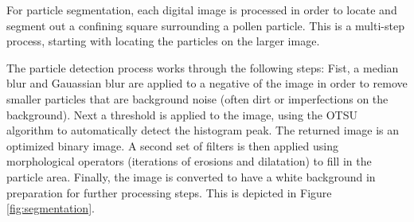 For particle segmentation, each digital image is processed in order to locate and segment out a confining square surrounding a pollen particle. This is a multi-step process, starting with locating the particles on the larger image.

The particle detection process works through the following steps: Fist, a median blur and Gauassian blur are applied to a negative of the image in order to remove smaller particles that are background noise (often dirt or imperfections on the background). 
Next a threshold is applied to the image, using the OTSU algorithm to automatically detect the histogram peak. The returned image is an optimized binary image. A second set of filters is then applied using morphological operators (iterations of erosions and dilatation) to fill in the particle area. Finally, the image is converted to have a white background in preparation for further processing steps. This is depicted in Figure \ref{fig:segmentation}.

  
  